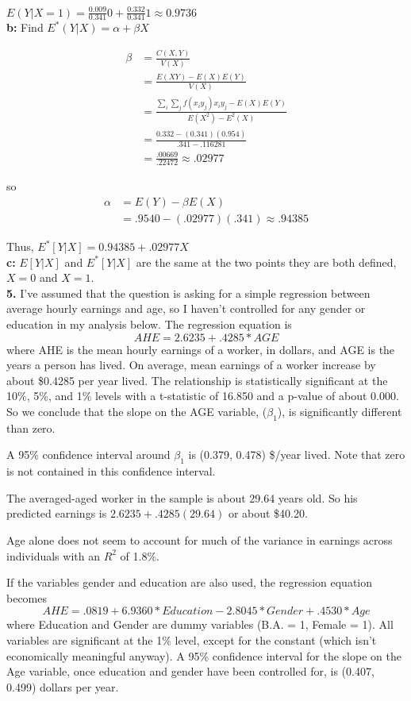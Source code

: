 \documentclass[11pt]{article}
\begin{document}
$E(Y|X = 1) = \frac{0.009}{0.341} 0 + \frac{0.332}{0.341} 1 \approx 0.9736$\\

\textbf{b:} Find $E^{*}(Y|X) = \alpha + \beta X$

\begin{align*}
    \beta &= \frac{C(X, Y)}{V(X)}\\
    &= \frac{E(XY) - E(X)E(Y)}{V(X)}\\
    &= \frac{\sum_{i} \sum_{j} f(x_{i}y_{j})x_{i}y_{j} - E(X)E(Y)}{E(X^{2}) - E^{2}(X)}\\
    &= \frac{0.332 - (0.341)(0.954)}{.341 - .116281}\\
    &= \frac{.00669}{.22472} \approx .02977
\end{align*}

so 
\begin{align*}
    \alpha &= E(Y) - \beta E(X)\\
    &= .9540 - (.02977)(.341) \approx .94385
\end{align*}

Thus, $E^{*}[Y|X] = 0.94385 + .02977X$\\

\textbf{c:} $E[Y|X]$ and $E^{*}[Y|X]$ are the same at the two points they are both defined, $X = 0$ and $X = 1$.\\

\textbf{5.}  I've assumed that the question is asking for a simple regression between average hourly earnings and age, so I haven't controlled for any gender or education in my analysis below.  The regression equation is 
\[
AHE = 2.6235 + .4285 * AGE
\]
where AHE is the mean hourly earnings of a worker, in dollars, and AGE is the years a person has lived.  On average, mean earnings of a worker increase by about \$0.4285 per year lived.  The relationship is statistically significant at the 10\%, 5\%, and 1\% levels with a t-statistic of 16.850 and a p-value of about 0.000.  So we conclude that the slope on the AGE variable, ($\beta_{1}$), is significantly different than zero.

A 95\% confidence interval around $\beta_{1}$ is (0.379, 0.478) \$/year lived.  Note that zero is not contained in this confidence interval.

The averaged-aged worker in the sample is about 29.64 years old.  So his predicted earnings is $2.6235 + .4285(29.64)$ or about \$40.20.

Age alone does not seem to account for much of the variance in earnings across individuals with an $R^{2}$ of 1.8\%.

If the variables gender and education are also used, the regression equation becomes
\begin{equation*}
    AHE = .0819 + 6.9360 * Education -2.8045 * Gender + .4530 * Age
\end{equation*}
where Education and Gender are dummy variables (B.A. = 1, Female = 1).  All variables are significant at the 1\% level, except for the constant (which isn't economically meaningful anyway).  A 95\% confidence interval for the slope on the Age variable, once education and gender have been controlled for, is (0.407, 0.499) dollars per year.
\end{document}
